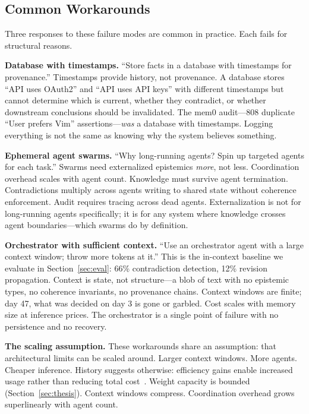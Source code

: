 \documentclass[11pt,letterpaper]{article}
\begin{document}
\subsection{Common Workarounds}

Three responses to these failure modes are common in practice. Each fails for structural reasons.

\textbf{Database with timestamps.} ``Store facts in a database with timestamps for provenance.'' Timestamps provide history, not provenance. A database stores ``API uses OAuth2'' and ``API uses API keys'' with different timestamps but cannot determine which is current, whether they contradict, or whether downstream conclusions should be invalidated. The mem0 audit---808 duplicate ``User prefers Vim'' assertions---\textit{was} a database with timestamps. Logging everything is not the same as knowing why the system believes something.

\textbf{Ephemeral agent swarms.} ``Why long-running agents? Spin up targeted agents for each task.'' Swarms need externalized epistemics \textit{more}, not less. Coordination overhead scales with agent count. Knowledge must survive agent termination. Contradictions multiply across agents writing to shared state without coherence enforcement. Audit requires tracing across dead agents. Externalization is not for long-running agents specifically; it is for any system where knowledge crosses agent boundaries---which swarms do by definition.

\textbf{Orchestrator with sufficient context.} ``Use an orchestrator agent with a large context window; throw more tokens at it.'' This is the in-context baseline we evaluate in Section~\ref{sec:eval}: 66\% contradiction detection, 12\% revision propagation. Context is state, not structure---a blob of text with no epistemic types, no coherence invariants, no provenance chains. Context windows are finite; day 47, what was decided on day 3 is gone or garbled. Cost scales with memory size at inference prices. The orchestrator is a single point of failure with no persistence and no recovery.

\textbf{The scaling assumption.} These workarounds share an assumption: that architectural limits can be scaled around. Larger context windows. More agents. Cheaper inference. History suggests otherwise: efficiency gains enable increased usage rather than reducing total cost~\cite{jevons1865}. Weight capacity is bounded (Section~\ref{sec:thesis}). Context windows compress. Coordination overhead grows superlinearly with agent count.
\end{document}
